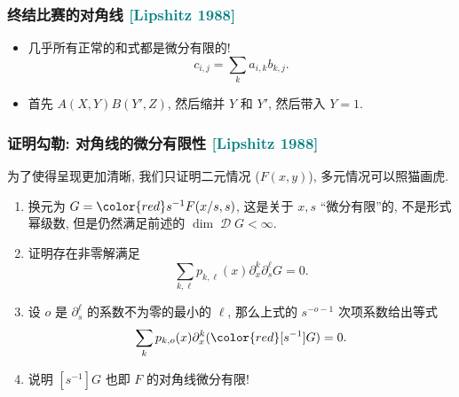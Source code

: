 \documentclass{ctexbeamer}
\newcommand{\cnote}[2][\footnotesize]{\textcolor{teal}{#1[#2]}}
\DeclareMathOperator{\calD}{\mathcal D}
\begin{document}
\begin{frame}
  \frametitle{终结比赛的对角线 \cnote{Lipshitz 1988}}

  \begin{itemize}
    \item 几乎所有正常的和式都是微分有限的!
    \begin{equation}
      c_{i,j} = \sum_k a_{i,k} b_{k, j}.
    \end{equation}
    \item<2-> 首先 $A(X, Y)B(Y', Z)$, 然后缩并 $Y$ 和 $Y'$, 然后带入 $Y=1$.
  \end{itemize}

\end{frame}

\begin{frame}
  \frametitle{证明勾勒: 对角线的微分有限性 \cnote{Lipshitz 1988}}

  为了使得呈现更加清晰, 我们只证明二元情况 ($F(x, y)$), 多元情况可以照猫画虎.

  \begin{enumerate}
    \item 换元为 $G = {\color{red}s^{-1}} F(x / s, s)$, 这是关于 $x,s$ ``微分有限''的, 
    不是形式幂级数, 但是仍然满足前述的 $\dim \calD G <\infty$.
    \item 证明存在非零解满足
    \begin{equation}
      \sum_{k, \ell} p_{k,\ell}(x) \partial_x^k \partial_s^\ell G = 0.
    \end{equation}
    \item 设 $o$ 是 $\partial_s^\ell$ 的系数不为零的最小的 $\ell$, 那么上式的 $s^{-o - 1}$ 次项系数给出等式
    \begin{equation}
      \sum_k p_{k, o}(x) \partial_x^k ({\color{red}[s^{-1}]} G) = 0.
    \end{equation}
    \item 说明 $[s^{-1}]G$ 也即 $F$ 的对角线微分有限! \hfill \qedsymbol
  \end{enumerate}

\end{frame}
\end{document}
